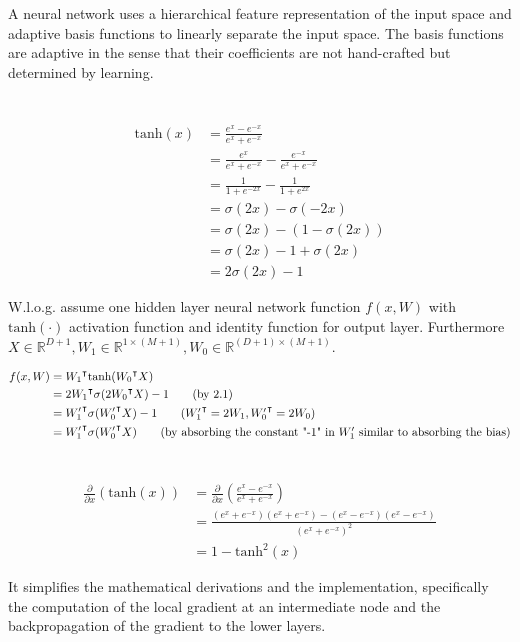 \documentclass[11pt]{article}
\newcommand{\exercise}{\section{}}
\newcommand{\tf}[1]{{#1}^{\intercal}}
\newcommand{\partialf}[1]{\frac{\partial}{{\partial #1}}}
\begin{document}
\exercise

A neural network uses a hierarchical feature representation of the input space and adaptive basis functions to linearly separate the input space. The basis functions are adaptive in the sense that their coefficients are not hand-crafted but determined by learning.

\exercise

\begin{align*}
\text{tanh}(x) &= \frac{e^x - e^{-x}}{e^x + e^{-x}} \\
&= \frac{e^x}{e^x + e^{-x}} - \frac{e^{-x}}{e^x + e^{-x}} \\
&= \frac{1}{1 + e^{-2x}} - \frac{1}{1 + e^{2x}} \\
&= \sigma(2x) - \sigma(-2x) \\
&= \sigma(2x) - (1 - \sigma(2x)) \\
&= \sigma(2x) - 1 + \sigma(2x) \\
&= 2\sigma(2x) - 1 \tag{2.1}
\end{align*}

\noindent W.l.o.g. assume one hidden layer neural network function $f(x, W)$ with $\text{tanh}(\cdot)$ activation function and identity function for output layer.
Furthermore $X \in \mathbb{R}^{D+1}, W_1 \in \mathbb{R}^{1 \times {(M+1)}}, W_0 \in \mathbb{R}^{(D+1) \times (M+1)}$.

\begin{align*}
f(x, W) &= \tf{W_1} \text{tanh}(\tf{W_0} X) \\
&= \tf{2W_1} \sigma(\tf{2W_0} X) - 1 \tag{by 2.1} \\
&= \tf{W_1^\prime} \sigma(\tf{W_0^\prime} X) - 1 \tag{$\tf{W_1^\prime} = 2W_1, \tf{W_0^\prime} = 2W_0$} \\
&= \tf{W_1^\prime} \sigma(\tf{W_0^\prime} X) \tag{by absorbing the constant "-1" in $W_1^\prime$ similar to absorbing the bias} \\
\end{align*}

\exercise

\begin{align*}
\partialf{x}(\text{tanh}(x)) &= \partialf{x}(\frac{e^x - e^{-x}}{e^x + e^{-x}}) \\
&= \frac{ ( e^x + e^{-x} )( e^x + e^{-x}) - ( e^x - e^{-x} )( e^x - e^{-x} )}{ ( e^x + e^{-x} )^2 } \\
&= 1 - \text{tanh}^2(x)
\end{align*}

\noindent It simplifies the mathematical derivations and the implementation, specifically the computation of the local gradient at an intermediate node and the backpropagation of the gradient to the lower layers.
\end{document}
